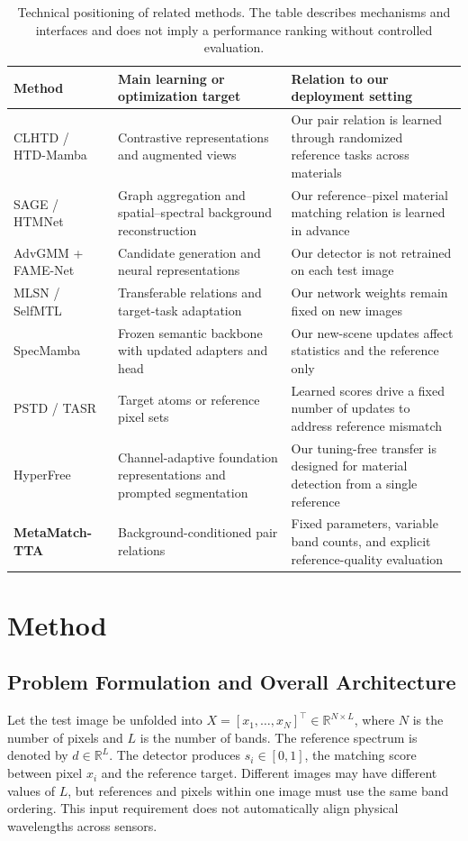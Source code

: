 \documentclass[a4paper,11pt]{article}
\newcommand{\R}{\mathbb{R}}
\newcommand{\method}{\textbf{MetaMatch-TTA}}
\begin{document}
\begin{table}[htbp]\centering\small\setlength{\tabcolsep}{4pt}
\caption{Technical positioning of related methods. The table describes mechanisms and interfaces and does not imply a performance ranking without controlled evaluation.}\label{tab:position}
\begin{tabularx}{\linewidth}{p{3.2cm}XX}\toprule
Method & Main learning or optimization target & Relation to our deployment setting \\ \midrule
CLHTD / HTD-Mamba & Contrastive representations and augmented views & Our pair relation is learned through randomized reference tasks across materials \\
SAGE / HTMNet & Graph aggregation and spatial--spectral background reconstruction & Our reference--pixel material matching relation is learned in advance \\
AdvGMM + FAME-Net & Candidate generation and neural representations & Our detector is not retrained on each test image \\
MLSN / SelfMTL & Transferable relations and target-task adaptation & Our network weights remain fixed on new images \\
SpecMamba & Frozen semantic backbone with updated adapters and head & Our new-scene updates affect statistics and the reference only \\
PSTD / TASR & Target atoms or reference pixel sets & Learned scores drive a fixed number of updates to address reference mismatch \\
HyperFree & Channel-adaptive foundation representations and prompted segmentation & Our tuning-free transfer is designed for material detection from a single reference \\
\textbf{\method{}} & Background-conditioned pair relations & Fixed parameters, variable band counts, and explicit reference-quality evaluation \\
\bottomrule\end{tabularx}
\end{table}
\FloatBarrier

\section{Method}
\subsection{Problem Formulation and Overall Architecture}
Let the test image be unfolded into $X=[x_1,\ldots,x_N]^\top\in\R^{N\times L}$, where $N$ is the number of pixels and $L$ is the number of bands. The reference spectrum is denoted by $d\in\R^L$. The detector produces $s_i\in[0,1]$, the matching score between pixel $x_i$ and the reference target. Different images may have different values of $L$, but references and pixels within one image must use the same band ordering. This input requirement does not automatically align physical wavelengths across sensors.
\end{document}
